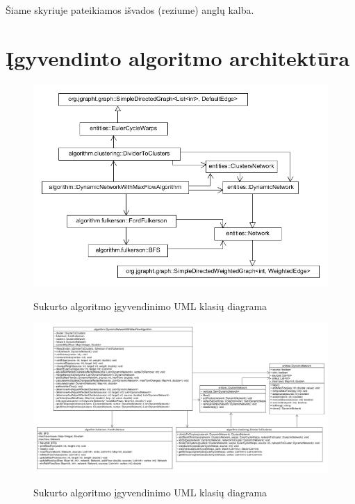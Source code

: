 \documentclass{VUMIFInfBakalaurinis}
\begin{document}
Šiame skyriuje pateikiamos išvados (reziume) anglų kalba.


\printbibliography[heading=bibintoc] %

\appendix  %

\section{Įgyvendinto algoritmo architektūra}
\begin{figure}[h]
	\caption{Sukurto algoritmo įgyvendinimo UML klasių diagrama}
	\centering
	\includegraphics[width=\textwidth]{img/architecture.png}
	\label{fig:architecture}
\end{figure}

\begin{figure}[h]
	\caption{Sukurto algoritmo įgyvendinimo UML klasių diagrama}
	\centering
	\includegraphics[width=1.5\textwidth, height=0.5\textheight, angle=90]{img/architecture0.png}
	\label{fig:architecture0}
\end{figure}
\end{document}
